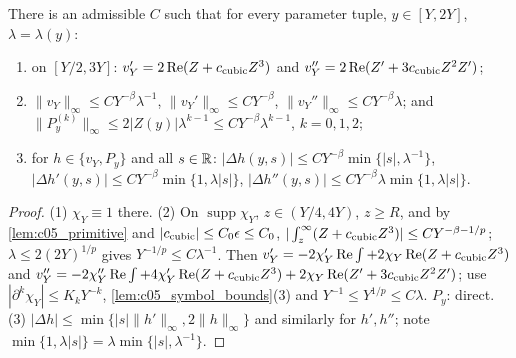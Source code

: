 \begin{lemma}
  \label{lem:c05_vY_bounds}
  There is an admissible $C$ such that for every parameter tuple, $y\in[Y,2Y]$, $\lambda=\lambda(y)$:
  \begin{enumerate}
    \item on $[Y/2,3Y]$: $v_Y'=2\operatorname{Re}(Z+c_{\textup{cubic}}Z^3)$ and $v_Y''=2\operatorname{Re}(Z'+3c_{\textup{cubic}}Z^2Z')$;
    \item \label{eqn:approx_vY_amplitude_bound}
      $\|v_Y\|_\infty\le CY^{-\beta}\lambda^{-1}$, $\|v_Y'\|_\infty\le CY^{-\beta}$, $\|v_Y''\|_\infty\le CY^{-\beta}\lambda$;
      and $\|P_y^{(k)}\|_\infty\le2|Z(y)|\lambda^{k-1}\le CY^{-\beta}\lambda^{k-1}$, $k=0,1,2$;
    \item for $h\in\{v_Y,P_y\}$ and all $s\in\mathbb{R}$:
      $|\Delta h(y,s)|\le CY^{-\beta}\min\{|s|,\lambda^{-1}\}$, $|\Delta h'(y,s)|\le CY^{-\beta}\min\{1,\lambda|s|\}$,
      $|\Delta h''(y,s)|\le CY^{-\beta}\lambda\min\{1,\lambda|s|\}$.
  \end{enumerate}
\end{lemma}
\begin{proof}
  (1) $\chi_Y\equiv1$ there. (2) On $\operatorname{supp}\chi_Y$, $z\in(Y/4,4Y)$, $z\ge R$, and by \cref{lem:c05_primitive} and
  $|c_{\textup{cubic}}|\le C_0\epsilon\le C_0$, $|\int_z^\infty(Z+c_{\textup{cubic}}Z^3)|\le CY^{-\beta-1/p}$; $\lambda\le2(2Y)^{1/p}$ gives
  $Y^{-1/p}\le C\lambda^{-1}$. Then $v_Y'=-2\chi_Y'\operatorname{Re}\int+2\chi_Y\operatorname{Re}(Z+c_{\textup{cubic}}Z^3)$ and
  $v_Y''=-2\chi_Y''\operatorname{Re}\int+4\chi_Y'\operatorname{Re}(Z+c_{\textup{cubic}}Z^3)+2\chi_Y\operatorname{Re}(Z'+3c_{\textup{cubic}}Z^2Z')$; use
  $|\partial^k\chi_Y|\le K_kY^{-k}$, \cref{lem:c05_symbol_bounds}(3) and $Y^{-1}\le Y^{1/p}\le C\lambda$. $P_y$: direct.
  (3) $|\Delta h|\le\min\{|s|\|h'\|_\infty,2\|h\|_\infty\}$ and similarly for $h',h''$; note $\min\{1,\lambda|s|\}=\lambda\min\{|s|,\lambda^{-1}\}$.
\end{proof}

